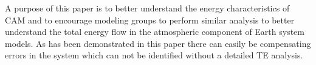 \documentclass{agujournal}
\begin{document}
A purpose of this paper is to better understand the energy characteristics of CAM and to encourage modeling groups to perform similar analysis to better understand the total energy flow in the atmospheric component of Earth system models. As has been demonstrated in this paper there can easily be compensating errors in the system which can not be identified without a detailed TE analysis.





%
%
%
%
%
%
%
%

%
% 
\end{document}
